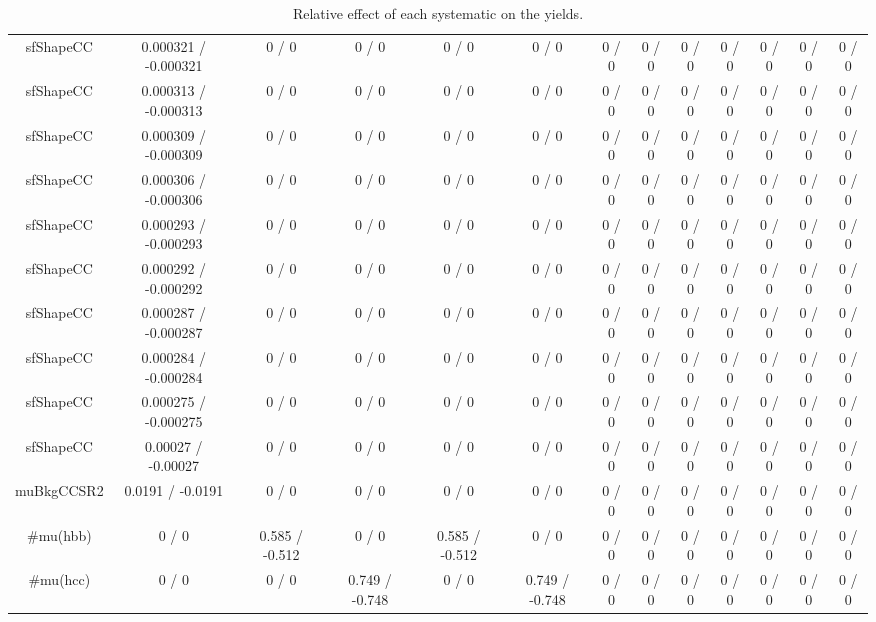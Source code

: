 \documentclass[10pt]{article}
\begin{document}
\begin{table}[htbp]
\begin{center}
\begin{tabular}{|c|c|c|c|c|c|c|c|c|c|c|c|c|}
  sfShapeCC & 0.000321 / -0.000321 & 0 / 0 & 0 / 0 & 0 / 0 & 0 / 0 & 0 / 0 & 0 / 0 & 0 / 0 & 0 / 0 & 0 / 0 & 0 / 0 & 0 / 0 \\ 
  sfShapeCC & 0.000313 / -0.000313 & 0 / 0 & 0 / 0 & 0 / 0 & 0 / 0 & 0 / 0 & 0 / 0 & 0 / 0 & 0 / 0 & 0 / 0 & 0 / 0 & 0 / 0 \\ 
  sfShapeCC & 0.000309 / -0.000309 & 0 / 0 & 0 / 0 & 0 / 0 & 0 / 0 & 0 / 0 & 0 / 0 & 0 / 0 & 0 / 0 & 0 / 0 & 0 / 0 & 0 / 0 \\ 
  sfShapeCC & 0.000306 / -0.000306 & 0 / 0 & 0 / 0 & 0 / 0 & 0 / 0 & 0 / 0 & 0 / 0 & 0 / 0 & 0 / 0 & 0 / 0 & 0 / 0 & 0 / 0 \\ 
  sfShapeCC & 0.000293 / -0.000293 & 0 / 0 & 0 / 0 & 0 / 0 & 0 / 0 & 0 / 0 & 0 / 0 & 0 / 0 & 0 / 0 & 0 / 0 & 0 / 0 & 0 / 0 \\ 
  sfShapeCC & 0.000292 / -0.000292 & 0 / 0 & 0 / 0 & 0 / 0 & 0 / 0 & 0 / 0 & 0 / 0 & 0 / 0 & 0 / 0 & 0 / 0 & 0 / 0 & 0 / 0 \\ 
  sfShapeCC & 0.000287 / -0.000287 & 0 / 0 & 0 / 0 & 0 / 0 & 0 / 0 & 0 / 0 & 0 / 0 & 0 / 0 & 0 / 0 & 0 / 0 & 0 / 0 & 0 / 0 \\ 
  sfShapeCC & 0.000284 / -0.000284 & 0 / 0 & 0 / 0 & 0 / 0 & 0 / 0 & 0 / 0 & 0 / 0 & 0 / 0 & 0 / 0 & 0 / 0 & 0 / 0 & 0 / 0 \\ 
  sfShapeCC & 0.000275 / -0.000275 & 0 / 0 & 0 / 0 & 0 / 0 & 0 / 0 & 0 / 0 & 0 / 0 & 0 / 0 & 0 / 0 & 0 / 0 & 0 / 0 & 0 / 0 \\ 
  sfShapeCC & 0.00027 / -0.00027 & 0 / 0 & 0 / 0 & 0 / 0 & 0 / 0 & 0 / 0 & 0 / 0 & 0 / 0 & 0 / 0 & 0 / 0 & 0 / 0 & 0 / 0 \\ 
  muBkgCCSR2 & 0.0191 / -0.0191 & 0 / 0 & 0 / 0 & 0 / 0 & 0 / 0 & 0 / 0 & 0 / 0 & 0 / 0 & 0 / 0 & 0 / 0 & 0 / 0 & 0 / 0 \\ 
  #mu(hbb) & 0 / 0 & 0.585 / -0.512 & 0 / 0 & 0.585 / -0.512 & 0 / 0 & 0 / 0 & 0 / 0 & 0 / 0 & 0 / 0 & 0 / 0 & 0 / 0 & 0 / 0 \\ 
  #mu(hcc) & 0 / 0 & 0 / 0 & 0.749 / -0.748 & 0 / 0 & 0.749 / -0.748 & 0 / 0 & 0 / 0 & 0 / 0 & 0 / 0 & 0 / 0 & 0 / 0 & 0 / 0 \\ 
\hline 
\end{tabular} 
\caption{Relative effect of each systematic on the yields.} 
\end{center} 
\end{table} 
\end{document}
